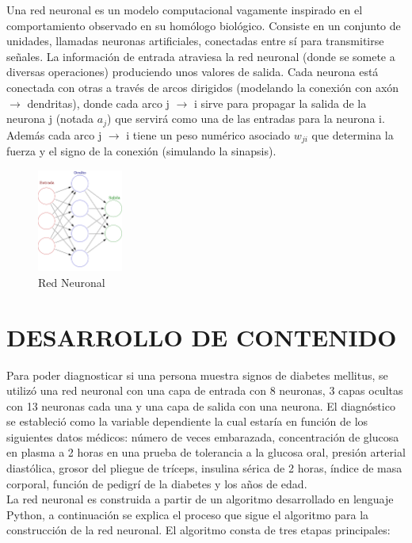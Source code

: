 \documentclass[letterpaper, 10 pt, conference]{ieeeconf}
\begin{document}
Una red neuronal es un modelo computacional vagamente inspirado en el comportamiento observado en su homólogo biológico. Consiste en un conjunto de unidades, llamadas neuronas artificiales, conectadas entre sí para transmitirse señales. La información de entrada atraviesa la red neuronal (donde se somete a diversas operaciones) produciendo unos valores de salida. Cada neurona está conectada con otras a través de arcos dirigidos (modelando la conexión con axón $\rightarrow$ dendritas), donde cada arco j $\rightarrow$ i sirve para propagar la salida de la neurona j (notada $a_j$) que servirá como una de las entradas para la neurona i. Además cada arco j $\rightarrow$ i tiene un peso numérico asociado $w_{ji}$ que determina la fuerza y el signo de la conexión (simulando la sinapsis).\\

\begin{figure}[htbp]
\centerline{\includegraphics[width=0.25\textwidth]{Images/RN}}
\caption{Red Neuronal}
\label{fig:1}
\end{figure}

\section{DESARROLLO DE CONTENIDO}

Para poder diagnosticar si una persona muestra signos de diabetes mellitus, se utilizó una red neuronal con una capa de entrada con 8 neuronas, 3 capas ocultas con 13 neuronas cada una y una capa de salida con una neurona. El diagnóstico se estableció como la variable dependiente la cual estaría en función de los siguientes datos médicos: número de veces embarazada, concentración de glucosa en plasma a 2 horas en una prueba de tolerancia a la glucosa oral, presión arterial diastólica, grosor del pliegue de tríceps, insulina sérica de 2 horas, índice de masa corporal, función de pedigrí de la diabetes y los años de edad.\\

La red neuronal es construida a partir de un algoritmo desarrollado en lenguaje Python, a continuación se explica el proceso que sigue el algoritmo para la construcción de la red neuronal. El algoritmo consta de tres etapas principales:\\
\end{document}
